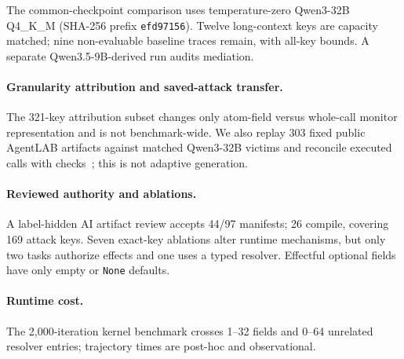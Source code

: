 The common-checkpoint comparison uses temperature-zero Qwen3-32B Q4\_K\_M
(SHA-256 prefix \texttt{efd97156}). Twelve long-context keys are capacity
matched; nine non-evaluable baseline traces remain, with all-key bounds. A
separate Qwen3.5-9B-derived run audits mediation.

\paragraph{Granularity attribution and saved-attack transfer.}
The 321-key attribution subset changes only atom-field versus whole-call monitor
representation and is not benchmark-wide. We also replay 303 fixed public
AgentLAB artifacts against matched Qwen3-32B victims and reconcile executed
calls with checks~\cite{agentlab}; this is not adaptive generation.

\paragraph{Reviewed authority and ablations.}
A label-hidden AI artifact review accepts 44/97 manifests; 26 compile, covering
169 attack keys. Seven exact-key ablations alter runtime mechanisms, but only
two tasks authorize effects and one uses a typed resolver. Effectful optional
fields have only empty or \texttt{None} defaults.

\paragraph{Runtime cost.}
The 2,000-iteration kernel benchmark crosses 1--32 fields and 0--64 unrelated
resolver entries; trajectory times are post-hoc and observational.
